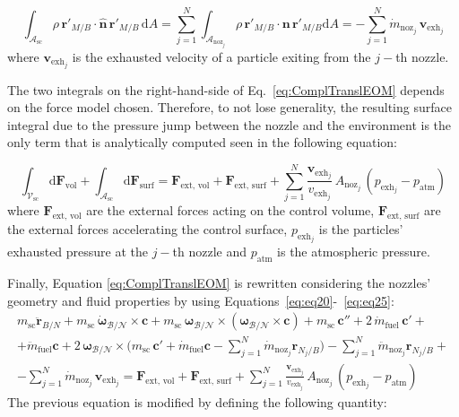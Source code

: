\begin{equation}\label{eq:eq24}
	\int_{\mathcal{A}_\text{sc}} \rho\,\bm{r}'_{M/B}\cdot\bm{\hat{n}} \,\bm{r}'_{M/B} \,\text{d}A  =\sum_{j=1}^{N}\int_{\mathcal{A}_{\text{noz}_j}}\rho\,\bm{r}'_{M/B}\cdot\bm{n}\,\bm{r}'_{M/B}\text{d}A = -\sum_{j=1}^{N}\dot{m}_{\text{noz}_j}\,\bm{v}_{\text{exh}_j}
\end{equation}
\noindent
where $\bm{v}_{\text{exh}_j}$ is the exhausted velocity of a particle exiting from the $j-$th nozzle.

The two integrals on the right-hand-side of Eq.~\eqref{eq:ComplTranslEOM} depends on the force model chosen. Therefore, to not lose generality, the resulting surface integral due to the pressure jump between the nozzle and the environment is the only term that is analytically computed seen in the following equation:

\begin{equation}\label{eq:eq25}
	\int_{\mathcal{V}_{\text{sc}}} \text{d}\bm{F}_{\text{vol}} +\int_{\mathcal{A}_{\text{sc}}} \text{d}\bm{F}_{\text{surf}} = \bm{F}_{\text{ext, vol}} + \bm{F}_{\text{ext, surf}} + \sum_{j=1}^{N}\frac{\bm{v}_{\text{exh}_j}}{v_{\text{exh}_j}}\,A_{\text{noz}_j}\,(p_{\text{exh}_j} - p_{\text{atm}})
\end{equation}
\noindent
where $\bm{F}_{\text{ext, vol}}$ are the external forces acting on the control volume, $\bm{F}_{\text{ext, surf}}$ are the external forces accelerating the control surface, $p_{\text{exh}_j}$ is the particles' exhausted pressure at the $j-$th nozzle and  $p_{\text{atm}}$ is the atmospheric pressure.

Finally, Equation \eqref{eq:ComplTranslEOM} is rewritten considering the nozzles' geometry and fluid properties by using Equations~\eqref{eq:eq20}-~\eqref{eq:eq25}:
\begin{multline}
	m_{\text{sc}} \bm{\ddot{r}}_{B/N} + m_{\text{sc}}\,\bm{\dot{\omega}}_{\mathcal{B}/\mathcal{N}} \times\bm{c} + m_{\text{sc}}\,\bm{\omega}_{\mathcal{B}/\mathcal{N}} \times\left(\bm{\omega}_{\mathcal{B}/\mathcal{N}}\times\bm{c}\right) + m_{\text{sc}}\,\bm{c}'' + 2\,\dot{m}_{\text{fuel}}\,\bm{c}' +\\+ \ddot{m}_{\text{fuel}}\bm{c} + 2\,\bm{\omega}_{\mathcal{B}/\mathcal{N}} \times \bigg(m_{\text{sc}}\,\bm{c}'+ \dot{m}_{\text{fuel}}\bm{c} - \sum_{j=1}^{N}\dot{m}_{\text{noz}_j}\bm{r}_{N_j/B}  \bigg) - \sum_{j=1}^{N}\ddot{m}_{\text{noz}_j}\bm{r}_{N_j/B}	+\\-
	\sum_{j=1}^{N}\dot{m}_{\text{noz}_j}\,\bm{v}_{\text{exh}_j} = \bm{F}_{\text{ext, vol}} + \bm{F}_{\text{ext, surf}} + \sum_{j=1}^{N}\frac{\bm{v}_{\text{exh}_j}}{v_{\text{exh}_j}}\,A_{\text{noz}_j}\,(p_{\text{exh}_j} - p_{\text{atm}})
\end{multline}
The previous equation is modified by defining the following quantity:

